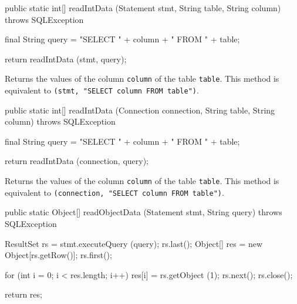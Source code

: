\begin{htmlonly}
\end{htmlonly}
\begin{code}

   public static int[] readIntData (Statement stmt, String table,
                                    String column)
            throws SQLException\begin{hide} {
        final String query = "SELECT " + column + " FROM " + table;
        
        return readIntData (stmt, query);
    }\end{hide}
\end{code}
\begin{tabb}
   Returns the values of the column \texttt{column} of the table \texttt{table}.
   This method is equivalent to 
   \texttt{(stmt, "SELECT column FROM table")}.
\end{tabb}
\begin{code}

   public static int[] readIntData (Connection connection, String table,
                                    String column)
            throws SQLException\begin{hide} {
        final String query = "SELECT " + column + " FROM " + table;
        
        return readIntData (connection, query);
    }\end{hide}
\end{code}
\begin{tabb}
   Returns the values of the column \texttt{column} of the table \texttt{table}.
   This method is equivalent to 
   \texttt{(connection, "SELECT column FROM table")}.
\end{tabb}
\begin{code}

   public static Object[] readObjectData (Statement stmt, String query)
            throws SQLException\begin{hide} {
      ResultSet rs = stmt.executeQuery (query);
      rs.last();
      Object[] res = new Object[rs.getRow()];
      rs.first();
        
      for (int i = 0; i < res.length; i++)
      {
         res[i] = rs.getObject (1);
         rs.next();
      }
      rs.close();
            
      return res;
   }\end{hide}
\end{code}
